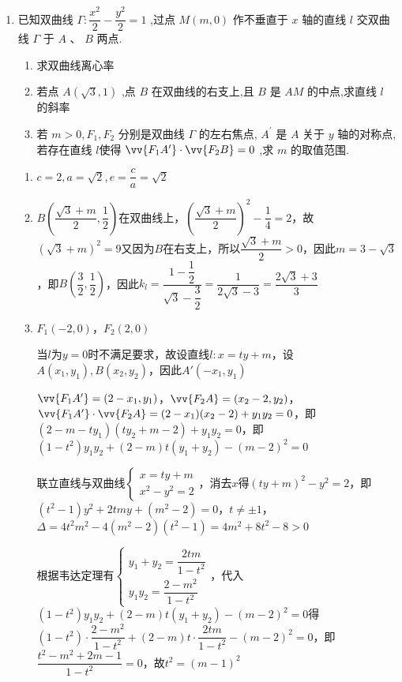 \begin{enumerate}
    \item 已知双曲线 $\Gamma  : \dfrac{{x}^{2}}{2} - \dfrac{{y}^{2}}{2} = 1$ ,过点 $M\left( {m,0}\right)$ 作不垂直于 $x$ 轴的直线 $l$ 交双曲线 $\Gamma$ 于 $A$ 、 $B$ 两点.
    \begin{enumerate}
        \item 求双曲线离心率
        \item 若点 $A\left( {\sqrt{3},1}\right)$ ,点 $B$ 在双曲线的右支上,且 $B$ 是 ${AM}$ 的中点,求直线 $l$ 的斜率
        \item 若 $m > 0,{F}_{1},{F}_{2}$ 分别是双曲线 $\Gamma$ 的左右焦点, ${A}^{\prime }$ 是 $A$ 关于 $y$ 轴的对称点,若存在直线 $l$使得 $\vv{{F}_{1}{A}^{\prime }} \cdot  \vv{{F}_{2}B} = 0$ ,求 $m$ 的取值范围.
    \end{enumerate}
    \begin{jieda}
        \begin{enumerate}
            \item $c = 2, a = \sqrt{2}, e = \dfrac{c}{a} = \sqrt{2}$
            \item $B\left(\dfrac{\sqrt{3}+m}{2}, \dfrac{1}{2}\right)$在双曲线上，$\left(\dfrac{\sqrt{3}+m}{2}\right)^2 - \dfrac{1}{4} = 2$，故$(\sqrt{3}+m)^2 =9$又因为$B$在右支上，所以$\dfrac{\sqrt{3}+m}{2} > 0$，因此$m = 3-\sqrt{3}$，即$B\left(\dfrac{3}{2}, \dfrac{1}{2}\right)$，因此$k_l = \dfrac{1-\dfrac{1}{2}}{\sqrt{3}-\dfrac{3}{2}} = \dfrac{1}{2\sqrt{3}-3} = \dfrac{2\sqrt{3}+3}{3}$
            \item $F_1(-2, 0)$，$F_2(2, 0)$
            
            当$l$为$y = 0$时不满足要求，故设直线$l:  x = ty + m$，设$A(x_1, y_1), B(x_2, y_2)$，因此$A'(-x_1, y_1)$

            $\vv{F_1A'} = (2-x_1, y_1)$，$\vv{F_2A} = (x_2-2, y_2)$，$\vv{F_1A'} \cdot \vv{F_2A} =(2-x_1)(x_2-2)+y_1y_2 = 0$，即$(2-m-ty_1)(ty_2+m-2)+y_1y_2 = 0$，即$(1-t^2)y_1y_2+(2-m)t(y_1+y_2)-(m-2)^2 = 0$

            联立直线与双曲线$\left\{\begin{array}{l}
                 x = ty+m  \\
                 x^2-y^2 = 2
            \end{array}\right.$，消去$x$得$(ty+m)^2-y^2 = 2$，即$(t^2-1)y^2+2tmy+(m^2-2) = 0$，$t \neq \pm 1$，$\Delta = 4t^2m^2 - 4(m^2-2)(t^2-1) = 4m^2+8t^2-8 > 0$

            根据韦达定理有$\left\{\begin{array}{l}
                 y_1+y_2 = \dfrac{2tm}{1-t^2} \\
                 y_1y_2 = \dfrac{2-m^2}{1-t^2}
            \end{array}\right.$，代入$(1-t^2)y_1y_2+(2-m)t(y_1+y_2) -(m-2)^2 = 0$得$(1-t^2)\cdot\dfrac{2-m^2}{1-t^2}+(2-m)t\cdot\dfrac{2tm}{1-t^2}-(m-2)^2 = 0$，即$\dfrac{t^2-m^2+2m-1}{1-t^2} = 0$，故$t^2 = (m-1)^2$


\end{enumerate}
\end{jieda}
\end{enumerate}
